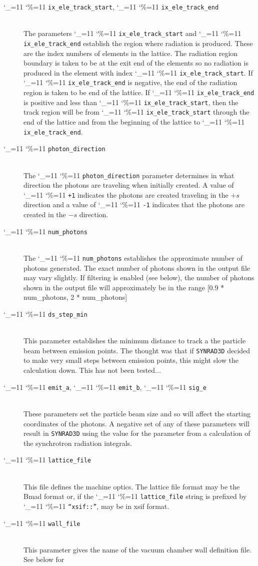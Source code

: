 \documentclass[11pt]{article}
\newcommand{\srthree}{\texttt{SYNRAD3D}\xspace}
\newcommand\ttcmd{\begingroup\catcode`\_=11 \catcode`\%=11 \dottcmd}
\newcommand\dottcmd[1]{\texttt{#1}\endgroup}
\newcommand{\vn}{\ttcmd}
\newcommand{\Newline}{\hfil \\}
\begin{document}
  \begin{description}
  \item[\vn{ix_ele_track_start}, \vn{ix_ele_track_end}] \Newline
The parameters \vn{ix_ele_track_start} and \vn{ix_ele_track_end} establish
the region where radiation is produced. These are the index numbers of 
elements in the lattice. The radiation region boundary is taken to be at
the exit end of the elements so no radiation is produced in the element
with index \vn{ix_ele_track_start}. If \vn{ix_ele_track_end} is negative,
the end of the radiation region is taken to be end of the lattice.
If \vn{ix_ele_track_end} is positive and less than \vn{ix_ele_track_start},
then the track region will be from \vn{ix_ele_track_start} through the
end of the lattice and from the beginning of the lattice to \vn{ix_ele_track_end}.
  \item[\vn{photon_direction}] \Newline
The \vn{photon_direction} parameter determines in what direction the photons
are traveling when initially created. A value of \vn{+1} indicates the photons
are created traveling in the $+s$ direction and a value of \vn{-1} indicates
that the photons are created in the $-s$ direction.
  \item[\vn{num_photons}] \Newline
The \vn{num_photons} establishes the approximate number of photons
generated.  The exact number of photons shown in the output file may vary
slightly. If filtering is enabled (see below), the number of photons shown
in the output file will approximately be in the range [0.9 * num_photons, 2 * num_photons]
  \item[\vn{ds_step_min}] \Newline
This parameter establishes the minimum distance to track a the particle beam between emission
points. The thought was that if \srthree decided to make very small steps  between emission
points, this might slow the calculation down. This has not been tested...
  \item[\vn{emit_a}, \vn{emit_b}, \vn{sig_e}] \Newline
These parameters set the particle beam size and so will affect the starting coordinates of
the photons. A negative set of any of these parameters will result in \srthree 
using the value for the parameter from a calculation of the synchrotron radiation integrals.
  \item[\vn{lattice_file}] \Newline
This file defines the
machine optics. The lattice file format may be the Bmad format or, if
the \vn{lattice_file} string is prefixed by \vn{``xsif::''},
may be in xsif format.
  \item[\vn{wall_file}] \Newline
This parameter gives the name of the vacuum chamber wall definition file. See below for

\end{description}
\end{document}
